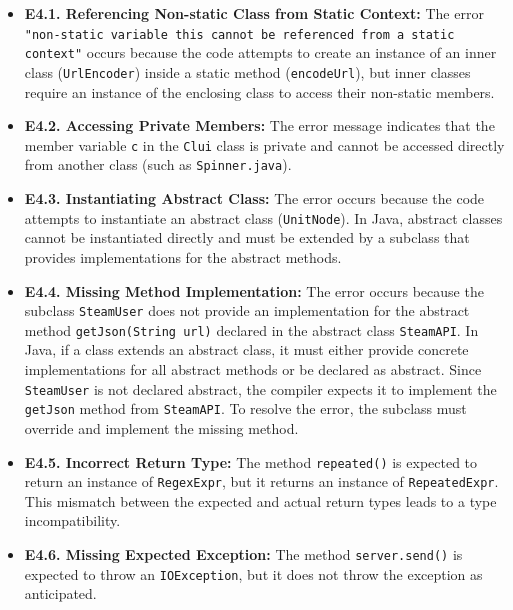 \begin{itemize}[left=10pt]
    \item \textbf{E4.1. Referencing Non-static Class from Static Context:}  
    The error \texttt{"non-static variable this cannot be referenced from a static context"} occurs because the code attempts to create an instance of an inner class (\texttt{UrlEncoder}) inside a static method (\texttt{encodeUrl}), but inner classes require an instance of the enclosing class to access their non-static members.
    
    \item \textbf{E4.2. Accessing Private Members:}  
    The error message indicates that the member variable \texttt{c} in the \texttt{Clui} class is private and cannot be accessed directly from another class (such as \texttt{Spinner.java}).
    
    \item \textbf{E4.3. Instantiating Abstract Class:}  
    The error occurs because the code attempts to instantiate an abstract class (\texttt{UnitNode}). In Java, abstract classes cannot be instantiated directly and must be extended by a subclass that provides implementations for the abstract methods.

    \item \textbf{E4.4. Missing Method Implementation:}  
    The error occurs because the subclass \texttt{SteamUser} does not provide an implementation for the abstract method \texttt{getJson(String url)} declared in the abstract class \texttt{SteamAPI}. In Java, if a class extends an abstract class, it must either provide concrete implementations for all abstract methods or be declared as abstract. Since \texttt{SteamUser} is not declared abstract, the compiler expects it to implement the \texttt{getJson} method from \texttt{SteamAPI}. To resolve the error, the subclass must override and implement the missing method.
    
    \item \textbf{E4.5. Incorrect Return Type:}  
    The method \texttt{repeated()} is expected to return an instance of \texttt{RegexExpr}, but it returns an instance of \texttt{RepeatedExpr}. This mismatch between the expected and actual return types leads to a type incompatibility.
    
    \item \textbf{E4.6. Missing Expected Exception:}  
    The method \texttt{server.send()} is expected to throw an \texttt{IOException}, but it does not throw the exception as anticipated.
    

\end{itemize}
